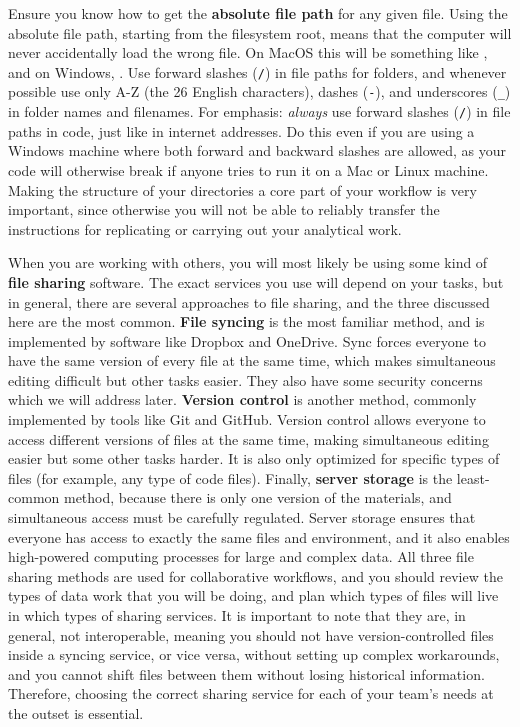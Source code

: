 Ensure you know how to get the \textbf{absolute file path} for any given file.
Using the absolute file path, starting from the filesystem root,
means that the computer will never accidentally load the wrong file.
On MacOS this will be something like ,
and on Windows, .
Use forward slashes (\texttt{/}) in file paths for folders,
and whenever possible use only A-Z (the 26 English characters),
dashes (\texttt{-}), and underscores (\texttt{\_}) in folder names and filenames.
For emphasis: \textit{always} use forward slashes (\texttt{/}) in file paths in code,
just like in internet addresses. Do this even if you are using a Windows machine where
both forward and backward slashes are allowed, as your code will otherwise break
if anyone tries to run it on a Mac or Linux machine.
Making the structure of your directories a core part of your workflow is very important,
since otherwise you will not be able to reliably transfer the instructions
for replicating or carrying out your analytical work.

When you are working with others, you will most likely be using
some kind of \textbf{file sharing} software.
The exact services you use will depend on your tasks,
but in general, there are several approaches to file sharing,
and the three discussed here are the most common.
\textbf{File syncing} is the most familiar method,
and is implemented by software like Dropbox and OneDrive.
Sync forces everyone to have the same version of every file at the same time,
which makes simultaneous editing difficult but other tasks easier.
They also have some security concerns which we will address later.
\textbf{Version control} is another method,
commonly implemented by tools like Git and GitHub.
Version control allows everyone to access different versions of files at the same time,
making simultaneous editing easier but some other tasks harder.
It is also only optimized for specific types of files
(for example, any type of code files).
Finally, \textbf{server storage} is the least-common method,
because there is only one version of the materials,
and simultaneous access must be carefully regulated.
Server storage ensures that everyone has access
to exactly the same files and environment, and it also enables
high-powered computing processes for large and complex data.
All three file sharing methods are used for collaborative workflows,
and you should review the types of data work
that you will be doing, and plan which types of files
will live in which types of sharing services.
It is important to note that they are, in general, not interoperable,
meaning you should not have version-controlled files inside a syncing service,
or vice versa, without setting up complex workarounds,
and you cannot shift files between them without losing historical information.
Therefore, choosing the correct sharing service for each of your team's needs at the outset is essential.

